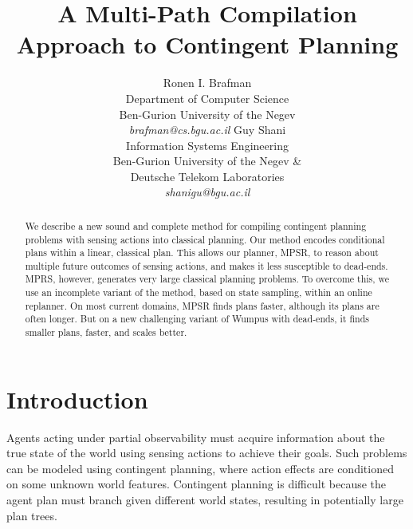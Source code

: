 \documentclass[letterpaper]{article}
\numberwithin{equation}{section}	%
\begin{document}
\title{A Multi-Path Compilation Approach to Contingent Planning}
\author{
  Ronen I. Brafman\\
 Department of Computer Science\\
 Ben-Gurion University of the Negev\\
 \textit{brafman@cs.bgu.ac.il}
 \And Guy Shani\\
Information Systems Engineering\\
Ben-Gurion University of the Negev \&\\
Deutsche Telekom Laboratories\\
\textit{shanigu@bgu.ac.il}}

\maketitle










\begin{abstract}
We describe a new sound and complete method for compiling contingent
planning problems with sensing actions into classical planning.
Our method encodes conditional plans within a linear, classical plan.
This allows our planner, MPSR, to reason about multiple future outcomes of sensing
actions, and makes it less susceptible to dead-ends.
MPRS, however, generates very large classical planning
problems. To overcome this, we use an incomplete variant
of the method, based on state sampling, within an online replanner.
On most current domains, MPSR finds plans faster, although its plans are often longer.
But on a new challenging variant of Wumpus with dead-ends,
it finds smaller plans, faster, and scales better.
\end{abstract}



\section{Introduction}
Agents acting under partial observability must acquire information about the true state of the world using sensing actions to achieve their goals. Such problems can be modeled using contingent planning, where action effects are conditioned on some unknown world features. Contingent planning is difficult because the agent plan must branch given different world states, resulting in potentially large plan trees.
\end{document}
